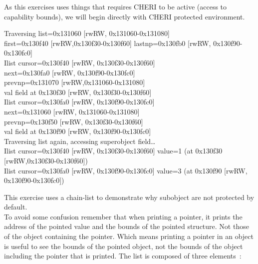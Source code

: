 \documentclass[a4paper, 11pt]{article}
\begin{document}
As this exercises uses things that requires CHERI to be active (access to capability bounds), we will begin directly with CHERI protected environment.
\begin{tcolorbox}[colback=gray!5!white, colframe=blue!75!black, title=Output On an environment protected by CHERI]
	Traversing list=0x131060 [rwRW, 0x131060-0x131080] \\
	first=0x130f40 [rwRW,0x130f30-0x130f60] lastnp=0x130fb0 [rwRW, 0x130f90-0x130fc0]\\
	Ilist cursor=0x130f40 [rwRW, 0x130f30-0x130f60]\\
	next=0x130fa0 [rwRW, 0x130f90-0x130fc0]\\
	prevnp=0x131070 [rwRW,0x131060-0x131080]\\
	val field at 0x130f30 [rwRW, 0x130f30-0x130f60]\\
	Ilist cursor=0x130fa0 [rwRW, 0x130f90-0x130fc0]\\
	next=0x131060 [rwRW, 0x131060-0x131080]\\
	prevnp=0x130f50 [rwRW, 0x130f30-0x130f60]\\
	val field at 0x130f90 [rwRW, 0x130f90-0x130fc0]\\
	Traversing list again, accessing superobject field\dots\\
	Ilist cursor=0x130f40 [rwRW, 0x130f30-0x130f60] value=1 (at 0x130f30 [rwRW,0x130f30-0x130f60])\\
	Ilist cursor=0x130fa0 [rwRW, 0x130f90-0x130fc0] value=3 (at 0x130f90 [rwRW, 0x130f90-0x130fc0])
\end{tcolorbox}

This exercise uses a chain-list to demonstrate why subobject are not protected by default.\\
To avoid some confusion remember that when printing a pointer, it prints the address of the pointed value and the bounds of the pointed structure. Not those of the object containing the pointer. Which means printing a pointer in an object is useful to see the bounds of the pointed object, not the bounds of the object including the pointer that is printed.
The list is composed of three elements :\\
\end{document}

